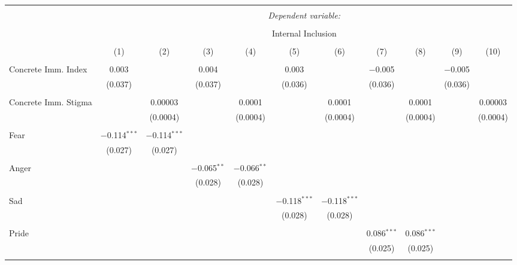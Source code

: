 
\begin{table}[!htbp] \centering 
  \caption{} 
  \label{} 
\begin{tabular}{@{\extracolsep{5pt}}lcccccccccc} 
\\[-1.8ex]\hline 
\hline \\[-1.8ex] 
 & \multicolumn{10}{c}{\textit{Dependent variable:}} \\ 
\cline{2-11} 
\\[-1.8ex] & \multicolumn{10}{c}{Internal Inclusion} \\ 
\\[-1.8ex] & (1) & (2) & (3) & (4) & (5) & (6) & (7) & (8) & (9) & (10)\\ 
\hline \\[-1.8ex] 
 Concrete Imm. Index & 0.003 &  & 0.004 &  & 0.003 &  & $-$0.005 &  & $-$0.005 &  \\ 
  & (0.037) &  & (0.037) &  & (0.036) &  & (0.036) &  & (0.036) &  \\ 
  & & & & & & & & & & \\ 
 Concrete Imm. Stigma &  & 0.00003 &  & 0.0001 &  & 0.0001 &  & 0.0001 &  & 0.00003 \\ 
  &  & (0.0004) &  & (0.0004) &  & (0.0004) &  & (0.0004) &  & (0.0004) \\ 
  & & & & & & & & & & \\ 
 Fear & $-$0.114$^{***}$ & $-$0.114$^{***}$ &  &  &  &  &  &  &  &  \\ 
  & (0.027) & (0.027) &  &  &  &  &  &  &  &  \\ 
  & & & & & & & & & & \\ 
 Anger &  &  & $-$0.065$^{**}$ & $-$0.066$^{**}$ &  &  &  &  &  &  \\ 
  &  &  & (0.028) & (0.028) &  &  &  &  &  &  \\ 
  & & & & & & & & & & \\ 
 Sad &  &  &  &  & $-$0.118$^{***}$ & $-$0.118$^{***}$ &  &  &  &  \\ 
  &  &  &  &  & (0.028) & (0.028) &  &  &  &  \\ 
  & & & & & & & & & & \\ 
 Pride &  &  &  &  &  &  & 0.086$^{***}$ & 0.086$^{***}$ &  &  \\ 
  &  &  &  &  &  &  & (0.025) & (0.025) &  &  \\ 
  & & & & & & & & & & \\ 

\end{tabular}
\end{table}
